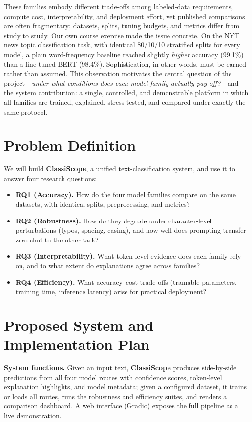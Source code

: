\documentclass[11pt]{article}
\begin{document}
These families embody different trade-offs among labeled-data requirements, compute cost, interpretability, and deployment effort, yet published comparisons are often fragmentary: datasets, splits, tuning budgets, and metrics differ from study to study. Our own course exercise made the issue concrete. On the NYT news topic classification task, with identical 80/10/10 stratified splits for every model, a plain word-frequency baseline reached slightly \emph{higher} accuracy (99.1\%) than a fine-tuned BERT (98.4\%). Sophistication, in other words, must be earned rather than assumed. This observation motivates the central question of the project---\emph{under what conditions does each model family actually pay off?}---and the system contribution: a single, controlled, and demonstrable platform in which all families are trained, explained, stress-tested, and compared under exactly the same protocol.

\section{Problem Definition}

We will build \textbf{ClassiScope}, a unified text-classification system, and use it to answer four research questions:

\begin{itemize}
\item \textbf{RQ1 (Accuracy).} How do the four model families compare on the same datasets, with identical splits, preprocessing, and metrics?
\item \textbf{RQ2 (Robustness).} How do they degrade under character-level perturbations (typos, spacing, casing), and how well does prompting transfer zero-shot to the other task?
\item \textbf{RQ3 (Interpretability).} What token-level evidence does each family rely on, and to what extent do explanations agree across families?
\item \textbf{RQ4 (Efficiency).} What accuracy--cost trade-offs (trainable parameters, training time, inference latency) arise for practical deployment?
\end{itemize}

\section{Proposed System and Implementation Plan}

\textbf{System functions.} Given an input text, \textbf{ClassiScope} produces side-by-side predictions from all four model routes with confidence scores, token-level explanation highlights, and model metadata; given a configured dataset, it trains or loads all routes, runs the robustness and efficiency suites, and renders a comparison dashboard. A web interface (Gradio) exposes the full pipeline as a live demonstration.
\end{document}
